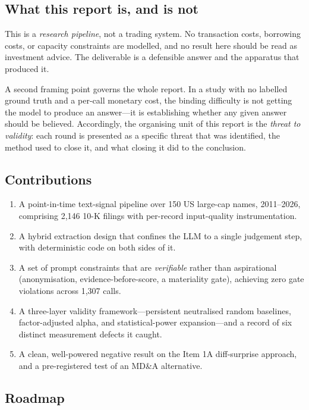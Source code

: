 \documentclass[11pt]{article}
\begin{document}
\subsection{What this report is, and is not}

This is a \emph{research pipeline}, not a trading system. No transaction costs, borrowing
costs, or capacity constraints are modelled, and no result here should be read as
investment advice. The deliverable is a defensible answer and the apparatus that produced
it.

A second framing point governs the whole report. In a study with no labelled ground truth
and a per-call monetary cost, the binding difficulty is not getting the model to produce
an answer---it is establishing whether any given answer should be believed. Accordingly,
the organising unit of this report is the \emph{threat to validity}: each round is
presented as a specific threat that was identified, the method used to close it, and what
closing it did to the conclusion.

\subsection{Contributions}

\begin{enumerate}[leftmargin=1.4em,itemsep=0.25em]
  \item A point-in-time text-signal pipeline over 150 US large-cap names, 2011--2026,
        comprising 2,146 10-K filings with per-record input-quality instrumentation.
  \item A hybrid extraction design that confines the LLM to a single judgement step,
        with deterministic code on both sides of it.
  \item A set of prompt constraints that are \emph{verifiable} rather than aspirational
        (anonymisation, evidence-before-score, a materiality gate), achieving zero gate
        violations across 1,307 calls.
  \item A three-layer validity framework---persistent neutralised random baselines,
        factor-adjusted alpha, and statistical-power expansion---and a record of six
        distinct measurement defects it caught.
  \item A clean, well-powered negative result on the Item 1A diff-surprise approach,
        and a pre-registered test of an MD\&A alternative.
\end{enumerate}

\subsection{Roadmap}
\end{document}
